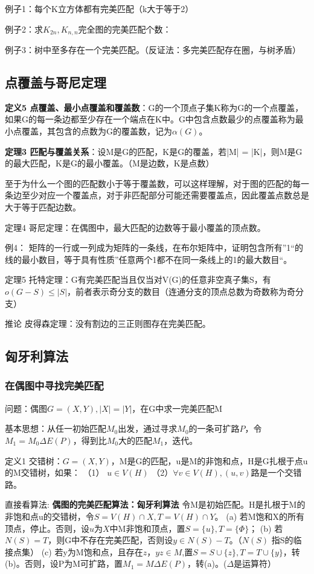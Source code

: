 \documentclass{article}
\begin{document}
例子1：每个K立方体都有完美匹配（k大于等于2）

例子2：求$K_{2n}, K_{n,n}$完全图的完美匹配个数：

例子3：树中至多存在一个完美匹配。（反证法：多完美匹配存在圈，与树矛盾）

\subsection{点覆盖与哥尼定理}

\textbf{定义5 点覆盖、最小点覆盖和覆盖数}：G的一个顶点子集K称为G的一个点覆盖，如果G的每一条边都至少存在一个端点在K中。G中包含点数最少的点覆盖称为最小点覆盖，其包含的点数为G的覆盖数，记为$\alpha(G)$。

\textbf{定理3 匹配与覆盖关系}：设M是G的匹配，K是G的覆盖，若|M| = |K|，则M是G的最大匹配，K是G的最小覆盖。（M是边数，K是点数）

至于为什么一个图的匹配数小于等于覆盖数，可以这样理解，对于图的匹配的每一条边至少对应一个覆盖点，对于非匹配部分可能还需要覆盖点，因此覆盖点数总是大于等于匹配边数。

定理4 哥尼定理：在偶图中，最大匹配的边数等于最小覆盖的顶点数。

例4： 矩阵的一行或一列成为矩阵的一条线，在布尔矩阵中，证明包含所有”1“的线的最小数目，等于具有性质”任意两个1都不在同一条线上的1的最大数目“。

定理5 托特定理：G有完美匹配当且仅当对V(G)的任意非空真子集S，有$o(G-S) \le |S|$，前者表示奇分支的数目（连通分支的顶点总数为奇数称为奇分支）

推论 皮得森定理：没有割边的三正则图存在完美匹配。

\subsection{匈牙利算法}

\subsubsection{在偶图中寻找完美匹配}

问题：偶图$G=(X,Y),|X|=|Y|$，在G中求一完美匹配M

基本思想：从任一初始匹配$M_0$出发，通过寻求$M_0$的一条可扩路$P$，令$M_1 = M_0 \Delta E(P)$，得到比$M_0$大的匹配$M_1$，迭代。

定义1 交错树：$G = (X,Y)$，M是G的匹配，u是M的非饱和点，H是G扎根于点u的M交错树，如果：
（1） $u \in V(H)$
（2）$\forall v \in V(H),(u,v)$路是一个交错路。

直接看算法:
\textbf{偶图的完美匹配算法：匈牙利算法}
令M是初始匹配。H是扎根于M的非饱和点u的交错树，令$S = V(H) \cap X, T = V(H) \cap Y$。
(a) 若M饱和X的所有顶点，停止。否则，设$u$为$X$中M非饱和顶点，置$S = \{u\}, T = \{ \Phi\}$；
(b) 若$N(S) = T$，则G中不存在完美匹配，否则设$y \in N(S) - T$。（$N(S)$
指S的临接点集）
(c) 若y为M饱和点，且存在$z$，$yz \in M$,置$S = S \cup \{z\}, T = T \cup \{y\}$，转(b)。否则，设P为M可扩路，置$M_1 = M \Delta E(P)$，转(a)。($\Delta$是运算符）
\end{document}
